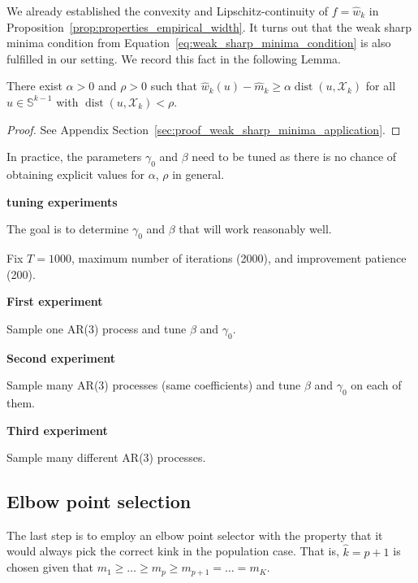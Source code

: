 We already established the convexity and Lipschitz-continuity of $f=\hat{w}_k$ in Proposition~\ref{prop:properties_empirical_width}. It turns out that the weak sharp minima condition from Equation~\eqref{eq:weak_sharp_minima_condition} is also fulfilled in our setting. We record this fact in the following Lemma.

\begin{Lem}\label{lem:weak_sharp_minima_application}
    There exist $\alpha>0$ and $\rho>0$ such that $\hat{w}_k(u)-\hat{m}_k\ge\alpha\operatorname{dist}(u,\mathcal{X}_k)$ for all $u\in\mathbb{S}^{k-1}$ with $\operatorname{dist}(u,\mathcal{X}_k)<\rho$.
\end{Lem}

\begin{proof}
    See Appendix Section~\ref{sec:proof_weak_sharp_minima_application}.
\end{proof}

In practice, the parameters $\gamma_0$ and $\beta$ need to be tuned as there is no chance of obtaining explicit values for $\alpha$, $\rho$ in general.


\textbf{tuning experiments}


The goal is to determine $\gamma_0$ and $\beta$ that will work reasonably well.

Fix $T=1000$, maximum number of iterations (2000), and improvement patience (200).

\textbf{First experiment}

Sample one AR(3) process and tune $\beta$ and $\gamma_0$.

\textbf{Second experiment}

Sample many AR(3) processes (same coefficients) and tune $\beta$ and $\gamma_0$ on each of them.

\textbf{Third experiment}

Sample many different AR(3) processes.



\subsection{Elbow point selection}\label{sec:elbow_point_selection}


The last step is to employ an elbow point selector with the property that it would always pick the correct kink in the population case. That is, $\hat{k}=p+1$ is chosen given that $m_1\ge\dots\ge m_p\ge m_{p+1}=\dots=m_K$.

